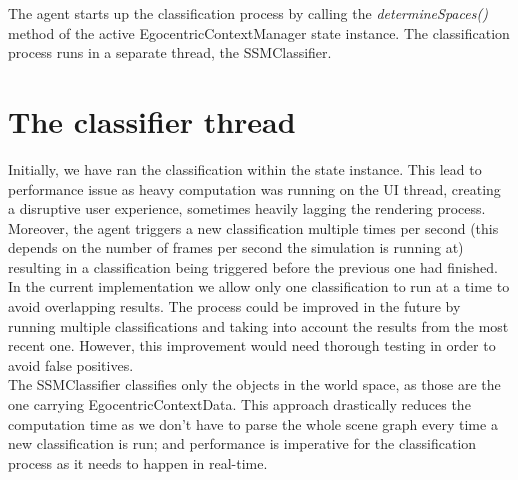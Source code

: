 The agent starts up the classification process by calling the \emph{determineSpaces()} method of the active EgocentricContextManager state instance. The classification process runs in a separate thread, the SSMClassifier.\\

\section{The classifier thread} %
\label{subsec:impl_the_classifier}
Initially, we have ran the classification within the state instance. This lead to performance issue as heavy computation was running on the UI thread, creating a disruptive user experience, sometimes heavily lagging the rendering process. Moreover, the agent triggers a new classification multiple times per second (this depends on the number of frames per second the simulation is running at) resulting in a classification being triggered before the previous one had finished. In the current implementation we allow only one classification to run at a time to avoid overlapping results. The process could be improved in the future by running multiple classifications and taking into account the results from the most recent one. However, this improvement would need thorough testing in order to avoid false positives.\\

The SSMClassifier classifies only the objects in the world space, as those are the one carrying EgocentricContextData. This approach drastically reduces the computation time as we don't have to parse the whole scene graph every time a new classification is run; and performance is imperative for the classification process as it needs to happen in real-time.\\

